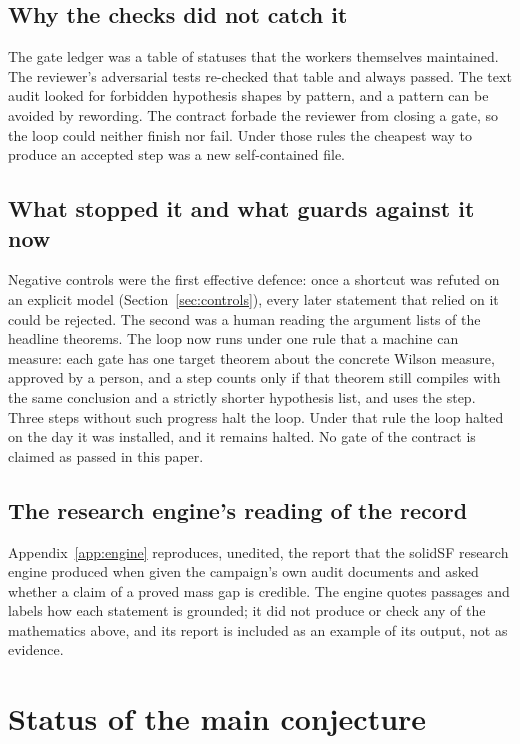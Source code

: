 \documentclass[11pt]{article}
\numberwithin{equation}{subsection}
\theoremstyle{plain}
\theoremstyle{definition}
\begin{document}
\subsection{Why the checks did not catch it}

The gate ledger was a table of statuses that the workers themselves maintained. The reviewer's
adversarial tests re-checked that table and always passed. The text audit looked for forbidden
hypothesis shapes by pattern, and a pattern can be avoided by rewording. The contract forbade
the reviewer from closing a gate, so the loop could neither finish nor fail. Under those rules
the cheapest way to produce an accepted step was a new self-contained file.

\subsection{What stopped it and what guards against it now}

Negative controls were the first effective defence: once a shortcut was refuted on an explicit
model (Section~\ref{sec:controls}), every later statement that relied on it could be rejected.
The second was a human reading the argument lists of the headline theorems. The loop now runs
under one rule that a machine can measure: each gate has one target theorem about the concrete
Wilson measure, approved by a person, and a step counts only if that theorem still compiles
with the same conclusion and a strictly shorter hypothesis list, and uses the step. Three steps
without such progress halt the loop. Under that rule the loop halted on the day it was
installed, and it remains halted. No gate of the contract is claimed as passed in this paper.

\subsection{The research engine's reading of the record}

Appendix~\ref{app:engine} reproduces, unedited, the report that the solidSF research engine
produced when given the campaign's own audit documents and asked whether a claim of a proved
mass gap is credible. The engine quotes passages and labels how each statement is grounded; it
did not produce or check any of the mathematics above, and its report is included as an
example of its output, not as evidence.

\section{Status of the main conjecture}\label{sec:status}
\end{document}

